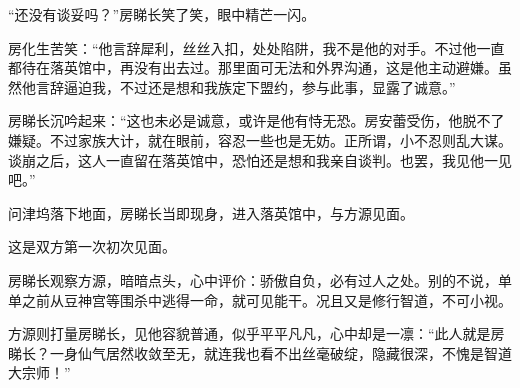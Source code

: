 \begin{this_body}
“还没有谈妥吗？”房睇长笑了笑，眼中精芒一闪。

房化生苦笑：“他言辞犀利，丝丝入扣，处处陷阱，我不是他的对手。不过他一直都待在落英馆中，再没有出去过。那里面可无法和外界沟通，这是他主动避嫌。虽然他言辞逼迫我，不过还是想和我族定下盟约，参与此事，显露了诚意。”

房睇长沉吟起来：“这也未必是诚意，或许是他有恃无恐。房安蕾受伤，他脱不了嫌疑。不过家族大计，就在眼前，容忍一些也是无妨。正所谓，小不忍则乱大谋。谈崩之后，这人一直留在落英馆中，恐怕还是想和我亲自谈判。也罢，我见他一见吧。”

问津坞落下地面，房睇长当即现身，进入落英馆中，与方源见面。

这是双方第一次初次见面。

房睇长观察方源，暗暗点头，心中评价：骄傲自负，必有过人之处。别的不说，单单之前从豆神宫等围杀中逃得一命，就可见能干。况且又是修行智道，不可小视。

方源则打量房睇长，见他容貌普通，似乎平平凡凡，心中却是一凛：“此人就是房睇长？一身仙气居然收敛至无，就连我也看不出丝毫破绽，隐藏很深，不愧是智道大宗师！”

\end{this_body}

